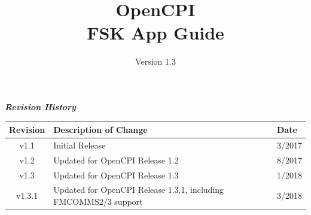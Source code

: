 \def\docTitle{OpenCPI\\ FSK App Guide}
\def\docVersion{1.3}

\date{Version \docVersion} %
\title{\docTitle}
\usepackage{graphicx}
\graphicspath{ {figures/} }
\usepackage{textcomp}


\maketitle
\newpage
	\begin{center}
	\textit{\textbf{Revision History}}
		\begin{table}[H]
		\label{table:revisions} %
			\begin{tabularx}{\textwidth}{|c|X|l|}
			\hline
			\rowcolor{blue}
			\textbf{Revision} & \textbf{Description of Change} & \textbf{Date} \\
		    \hline
		    v1.1 & Initial Release & 3/2017 \\
		    \hline
		    v1.2 & Updated for OpenCPI Release 1.2 & 8/2017 \\
			\hline
			v1.3 & Updated for OpenCPI Release 1.3 & 1/2018 \\
			\hline
			v1.3.1 & Updated for OpenCPI Release 1.3.1, including FMCOMMS2/3 support & 3/2018 \\
			\hline
			\end{tabularx}
		\end{table}
	\end{center}

